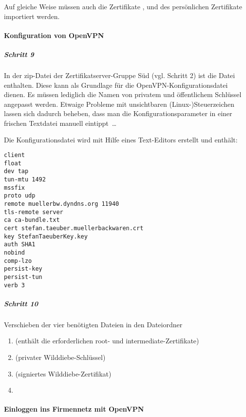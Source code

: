 Auf gleiche Weise müssen auch die Zertifikate
,  und des
persönlichen Zertifikate  importiert
werden.

\paragraph{Konfiguration von OpenVPN}

\subparagraph{Schritt 9}

In der zip-Datei der Zertifikatserver-Gruppe Süd (vgl. Schritt 2) ist die Datei
 enthalten. Diese kann als Grundlage für die
OpenVPN\hyp Konfigurationsdatei dienen. Es müssen lediglich die Namen von privatem
und öffentlichem Schlüssel angepasst werden. Etwaige Probleme mit unsichtbaren
(Linux-)Steuerzeichen lassen sich \zB{} dadurch beheben, dass man die
Konfigurationsparameter in einer \glqq{}frischen\grqq{} Textdatei manuell eintippt~\dots

Die Konfigurationsdatei  wird mit Hilfe eines
Text-Editors erstellt und enthält:

\begin{lstlisting}[keywordstyle=\color{black}]
client
float
dev tap
tun-mtu 1492
mssfix
proto udp
remote muellerbw.dyndns.org 11940
tls-remote server
ca ca-bundle.txt
cert stefan.taeuber.muellerbackwaren.crt
key StefanTaeuberKey.key
auth SHA1
nobind
comp-lzo
persist-key
persist-tun
verb 3
\end{lstlisting}

\subparagraph{Schritt 10}

Verschieben der vier benötigten Dateien in den Dateiordner

\begin{enumerate}
  \item {} (enthält die erforderlichen root- und intermediate\hyp Zertifikate)
  \item {} (privater \glqq{}Wilddiebe-Schlüssel\grqq{})
  \item {} (signiertes \glqq{}Wilddiebe\hyp Zertifikat\grqq{})
  \item {} 
\end{enumerate}

\paragraph{Einloggen ins Firmennetz mit OpenVPN}

